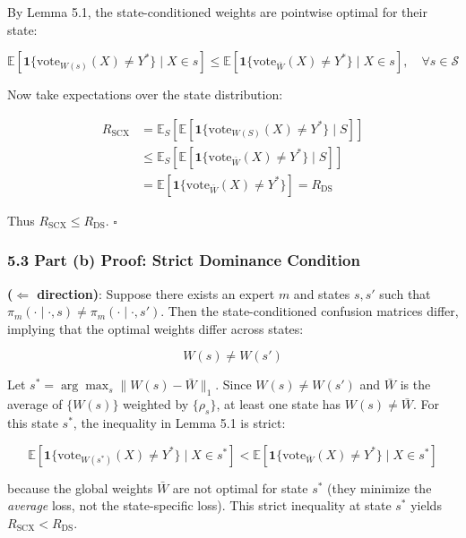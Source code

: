 \documentclass[
  12pt,
]{ctexart}
\begin{document}
By Lemma 5.1, the state-conditioned weights are pointwise optimal for
their state:

\[\mathbb{E}\left[ \mathbf{1}\{\text{vote}_{W(s)}(X) \neq Y^*\} \;\Big|\; X \in s \right] \leq \mathbb{E}\left[ \mathbf{1}\{\text{vote}_{\bar{W}}(X) \neq Y^*\} \;\Big|\; X \in s \right], \quad \forall s \in \mathcal{S}\]

Now take expectations over the state distribution:

\[\begin{aligned}
R_{\text{SCX}} &= \mathbb{E}_S\left[ \mathbb{E}\left[ \mathbf{1}\{\text{vote}_{W(S)}(X) \neq Y^*\} \;\Big|\; S \right] \right] \\
&\leq \mathbb{E}_S\left[ \mathbb{E}\left[ \mathbf{1}\{\text{vote}_{\bar{W}}(X) \neq Y^*\} \;\Big|\; S \right] \right] \\
&= \mathbb{E}\left[ \mathbf{1}\{\text{vote}_{\bar{W}}(X) \neq Y^*\} \right] = R_{\text{DS}}
\end{aligned}\]

Thus \(R_{\text{SCX}} \leq R_{\text{DS}}\). \(\square\)

\subsubsection{5.3 Part (b) Proof: Strict Dominance
Condition}\label{part-b-proof-strict-dominance-condition}

\textbf{(\(\Leftarrow\) direction)}: Suppose there exists an expert
\(m\) and states \(s, s'\) such that
\(\pi_m(\cdot \mid \cdot, s) \neq \pi_m(\cdot \mid \cdot, s')\). Then
the state-conditioned confusion matrices differ, implying that the
optimal weights differ across states:

\[W(s) \neq W(s')\]

Let \(s^* = \arg\max_s \|W(s) - \bar{W}\|_1\). Since \(W(s) \neq W(s')\)
and \(\bar{W}\) is the average of \(\{W(s)\}\) weighted by
\(\{\rho_s\}\), at least one state has \(W(s) \neq \bar{W}\). For this
state \(s^*\), the inequality in Lemma 5.1 is strict:

\[\mathbb{E}\left[ \mathbf{1}\{\text{vote}_{W(s^*)}(X) \neq Y^*\} \;\Big|\; X \in s^* \right] < \mathbb{E}\left[ \mathbf{1}\{\text{vote}_{\bar{W}}(X) \neq Y^*\} \;\Big|\; X \in s^* \right]\]

because the global weights \(\bar{W}\) are not optimal for state \(s^*\)
(they minimize the \emph{average} loss, not the state-specific loss).
This strict inequality at state \(s^*\) yields
\(R_{\text{SCX}} < R_{\text{DS}}\).
\end{document}
